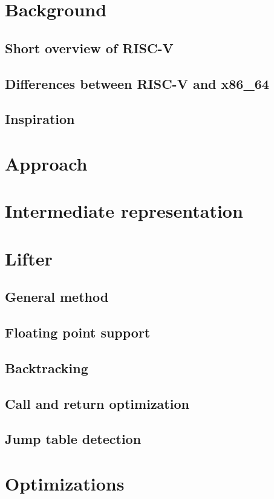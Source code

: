 \documentclass[course=eragp]{aspdoc}
\begin{document}
\section{Background}
\subsection{Short overview of RISC-V}
\subsection{Differences between RISC-V and x86\_64}
\subsection{Inspiration}

\section{Approach}

\section{Intermediate representation}

\section{Lifter}
\subsection{General method}
\subsection{Floating point support}
\subsection{Backtracking}
\subsection{Call and return optimization}
\subsection{Jump table detection}

\section{Optimizations}
\end{document}
